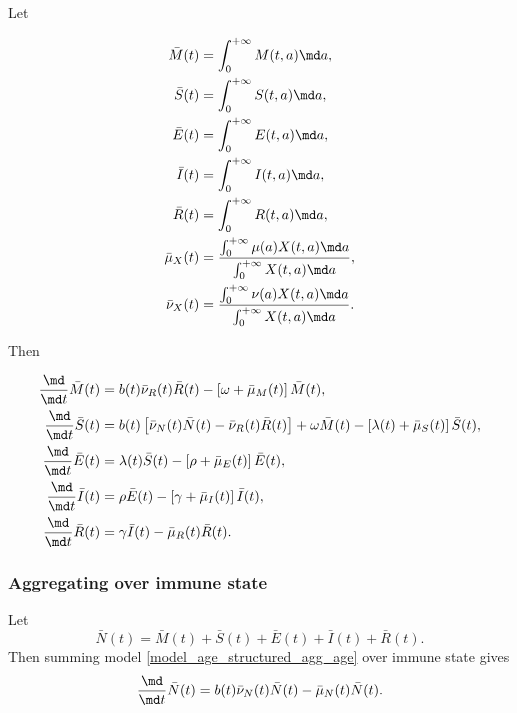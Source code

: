 \documentclass{jpmarticle}
\let\subequationsorig\subequations%
\let\endsubequationsorig\endsubequations%
\renewenvironment{subequations}{
  \subequationsorig
  \renewcommand{\theequation}{\theparentequation.\arabic{equation}}
}{
  \endsubequationsorig
}
\begin{document}
Let
\begin{subequations}
  \begin{align}
    \bar{M}(t) &= \int_0^{+\infty} M(t, a) \md a,
    \\
    \bar{S}(t) &= \int_0^{+\infty} S(t, a) \md a,
    \\
    \bar{E}(t) &= \int_0^{+\infty} E(t, a) \md a,
    \\
    \bar{I}(t) &= \int_0^{+\infty} I(t, a) \md a,
    \\
    \bar{R}(t) &= \int_0^{+\infty} R(t, a) \md a,
    \\
    \bar{\mu}_X(t)
    &= \frac{\int_0^{+\infty} \mu(a) X(t, a) \md a}
    {\int_0^{+\infty} X(t, a) \md a},
    \\
    \bar{\nu}_X(t)
    &= \frac{\int_0^{+\infty} \nu(a) X(t, a) \md a}
    {\int_0^{+\infty} X(t, a) \md a}.
  \end{align}
\end{subequations}
Then
\begin{subequations}
  \label{model_age_structured_agg_age}
  \begin{align}
    \frac{\md}{\md t} \bar{M}(t)
    &= b(t) \bar{\nu}_R(t) \bar{R}(t)
    - \left[\omega + \bar{\mu}_M(t)\right] \bar{M}(t),
    \\
    \frac{\md}{\md t} \bar{S}(t)
    &= b(t) \left[
      \bar{\nu}_N(t) \bar{N}(t)
      - \bar{\nu}_R(t) \bar{R}(t)
    \right]
    + \omega \bar{M}(t)
    - \left[\lambda(t) + \bar{\mu}_S(t)\right] \bar{S}(t),
    \\
    \frac{\md}{\md t} \bar{E}(t)
    &= \lambda(t) \bar{S}(t)
    - \left[\rho + \bar{\mu}_E(t)\right] \bar{E}(t),
    \\
    \frac{\md}{\md t} \bar{I}(t)
    &= \rho \bar{E}(t)
    - \left[\gamma + \bar{\mu}_I(t)\right] \bar{I}(t),
    \\
    \frac{\md}{\md t} \bar{R}(t)
    &= \gamma \bar{I}(t)
    - \bar{\mu}_R(t) \bar{R}(t).
  \end{align}
\end{subequations}


\subsubsection{Aggregating over immune state}

Let
\begin{equation}
  \bar{N}(t)
  = \bar{M}(t) + \bar{S}(t) + \bar{E}(t) + \bar{I}(t) + \bar{R}(t).
\end{equation}
Then summing model \eqref{model_age_structured_agg_age} over immune
state gives
\begin{equation}
  \label{model_age_structured_agg_age_state}
  \frac{\md}{\md t} \bar{N}(t)
  = b(t) \bar{\nu}_N(t) \bar{N}(t)
  - \bar{\mu}_N(t) \bar{N}(t).
\end{equation}
\end{document}
